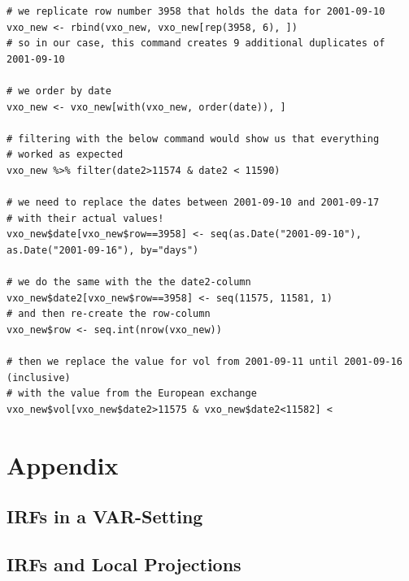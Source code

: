 \documentclass[a4paper,12pt,oneside,pointednumbers,bibtotoc,bigheadings,liststotoc]{scrbook}
\begin{document}
\begin{verbatim}
# we replicate row number 3958 that holds the data for 2001-09-10
vxo_new <- rbind(vxo_new, vxo_new[rep(3958, 6), ])
# so in our case, this command creates 9 additional duplicates of 2001-09-10

# we order by date
vxo_new <- vxo_new[with(vxo_new, order(date)), ]

# filtering with the below command would show us that everything
# worked as expected
vxo_new %>% filter(date2>11574 & date2 < 11590)

# we need to replace the dates between 2001-09-10 and 2001-09-17
# with their actual values!
vxo_new$date[vxo_new$row==3958] <- seq(as.Date("2001-09-10"), as.Date("2001-09-16"), by="days")

# we do the same with the the date2-column
vxo_new$date2[vxo_new$row==3958] <- seq(11575, 11581, 1)
# and then re-create the row-column
vxo_new$row <- seq.int(nrow(vxo_new))

# then we replace the value for vol from 2001-09-11 until 2001-09-16 (inclusive)
# with the value from the European exchange
vxo_new$vol[vxo_new$date2>11575 & vxo_new$date2<11582] <

\end{verbatim}  
\endgroup


\restoregeometry
\chapter{Appendix}
\label{VARAndLocalProjection}
\section{IRFs in a VAR-Setting}
\section{IRFs and Local Projections}


\nocite{*}
\clearpage
\thispagestyle{empty}







\clearpage
\thispagestyle{empty}
\null\vspace{46pt}
\end{document}
